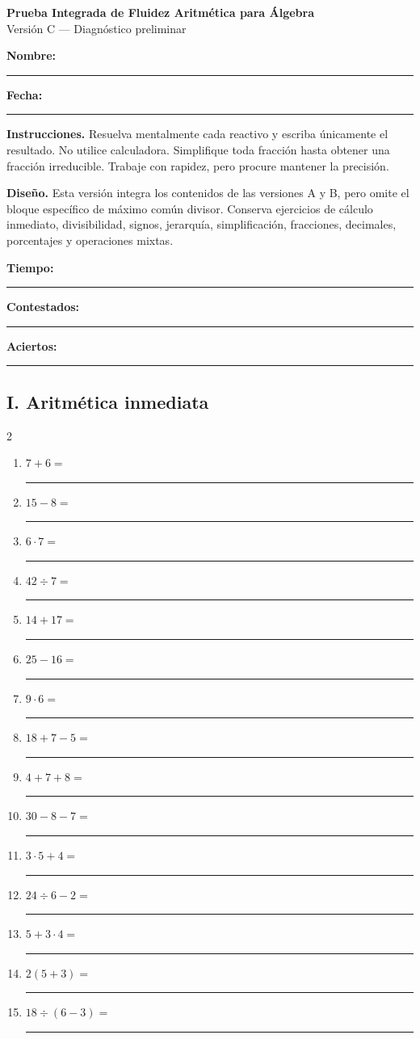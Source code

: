 \documentclass[11pt]{article}
\begin{document}
\begin{center}
{\Large\bfseries Prueba Integrada de Fluidez Aritmética para Álgebra}\\[1mm]
{\large Versión C --- Diagnóstico preliminar}
\end{center}

\textbf{Nombre:} \rule{9cm}{0.4pt}\hfill
\textbf{Fecha:} \rule{3cm}{0.4pt}

\medskip
\textbf{Instrucciones.} Resuelva mentalmente cada reactivo y escriba únicamente
el resultado. No utilice calculadora. Simplifique toda fracción hasta obtener
una fracción irreducible. Trabaje con rapidez, pero procure mantener la precisión.

\medskip
\textbf{Diseño.} Esta versión integra los contenidos de las versiones A y B,
pero omite el bloque específico de máximo común divisor. Conserva ejercicios
de cálculo inmediato, divisibilidad, signos, jerarquía, simplificación,
fracciones, decimales, porcentajes y operaciones mixtas.

\medskip
\textbf{Tiempo:} \rule{2.5cm}{0.4pt}\hfill
\textbf{Contestados:} \rule{1.5cm}{0.4pt}\hfill
\textbf{Aciertos:} \rule{1.5cm}{0.4pt}

\subsection*{I. Aritmética inmediata}
\begin{multicols}{2}\begin{enumerate}[leftmargin=*,start=1]
\item $\displaystyle 7+6=$ \rule{2.1cm}{0.4pt}
\item $\displaystyle 15-8=$ \rule{2.1cm}{0.4pt}
\item $\displaystyle 6\cdot7=$ \rule{2.1cm}{0.4pt}
\item $\displaystyle 42\div7=$ \rule{2.1cm}{0.4pt}
\item $\displaystyle 14+17=$ \rule{2.1cm}{0.4pt}
\item $\displaystyle 25-16=$ \rule{2.1cm}{0.4pt}
\item $\displaystyle 9\cdot6=$ \rule{2.1cm}{0.4pt}
\item $\displaystyle 18+7-5=$ \rule{2.1cm}{0.4pt}
\item $\displaystyle 4+7+8=$ \rule{2.1cm}{0.4pt}
\item $\displaystyle 30-8-7=$ \rule{2.1cm}{0.4pt}
\item $\displaystyle 3\cdot5+4=$ \rule{2.1cm}{0.4pt}
\item $\displaystyle 24\div6-2=$ \rule{2.1cm}{0.4pt}
\item $\displaystyle 5+3\cdot4=$ \rule{2.1cm}{0.4pt}
\item $\displaystyle 2(5+3)=$ \rule{2.1cm}{0.4pt}
\item $\displaystyle 18\div(6-3)=$ \rule{2.1cm}{0.4pt}
\end{enumerate}\end{multicols}
\end{document}
